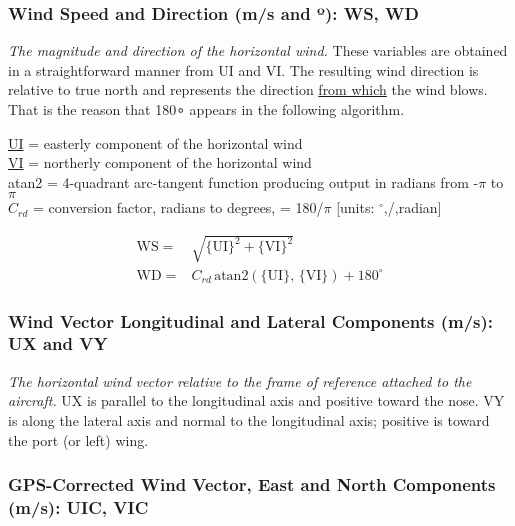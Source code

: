 \documentclass[
]{book}
\begin{document}
\hypertarget{ws-wd}{%
\subsubsection*{\texorpdfstring{Wind Speed and Direction (m/s and {º}): WS, WD}{Wind Speed and Direction (m/s and º): WS, WD}}\label{ws-wd}}

\emph{The magnitude and direction of the horizontal wind.} These variables are obtained in a straightforward manner from UI and VI. The resulting wind direction is relative to true north and represents the direction \uline{from which} the wind blows. That is the reason that 180{∘} appears in the following algorithm.

\protect\hyperlink{ui-vi-wi}{UI} = easterly component of the horizontal wind\\
\protect\hyperlink{ui-vi-wi}{VI} = northerly component of the horizontal wind\\
atan2 = 4-quadrant arc-tangent function producing output in radians
from -\(\pi\) to \(\pi\)\\
\(C_{rd}\) = conversion factor, radians to degrees, = 180/\(\pi\) {[}units: \(^{\circ}\),/,radian{]}

\begin{align}
\mathrm{WS} = & \sqrt{\mathrm{\{UI\}}^{2}+\{\mathrm{VI\}}^{2}}\label{eq:WS}\\
\mathrm{WD} = & C_{rd}\mathrm{\,atan2(\{UI\},\,\{VI\})}+180^{\circ}  
\label{eq:WD}
\end{align}

\hypertarget{ux-vy}{%
\subsubsection*{Wind Vector Longitudinal and Lateral Components (m/s): UX and VY}\label{ux-vy}}

\emph{The horizontal wind} \emph{vector relative to the frame of reference attached to the aircraft.} UX is parallel to the longitudinal axis and positive toward the nose. VY is along the lateral axis and normal to the longitudinal axis; positive is toward the port (or left) wing.

\hypertarget{uic-vic}{%
\subsubsection*{GPS-Corrected Wind Vector, East and North Components (m/s): UIC, VIC}\label{uic-vic}}
\end{document}

